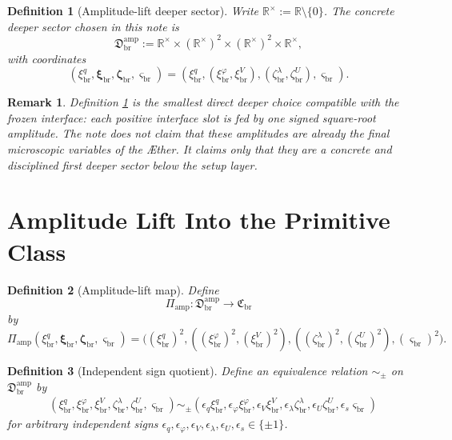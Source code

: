 \documentclass[11pt]{article}
\newcommand{\Aether}{\AE{}ther}
\newcommand{\PrimClass}{\mathfrak C_{\mathrm{br}}}
\newcommand{\DeepSector}{\mathfrak D_{\mathrm{br}}^{\mathrm{amp}}}
\newcommand{\DeepReadAmp}{\xi_{\mathrm{br}}^{q}}
\newcommand{\DeepCovAmp}{\xi_{\mathrm{br}}^{\varphi}}
\newcommand{\DeepRelaxAmp}{\xi_{\mathrm{br}}^{V}}
\newcommand{\DeepKinAmp}{\bm\xi_{\mathrm{br}}}
\newcommand{\DeepWellAmp}{\zeta_{\mathrm{br}}^{\lambda}}
\newcommand{\DeepEqAmp}{\zeta_{\mathrm{br}}^{U}}
\newcommand{\DeepAnchorAmp}{\bm\zeta_{\mathrm{br}}}
\newcommand{\DeepScaleAmp}{\varsigma_{\mathrm{br}}}
\newcommand{\AmpMap}{\Pi_{\mathrm{amp}}}
\newcommand{\SignQuot}{\sim_{\pm}}
\newcommand{\Rstar}{\mathbb R^{\times}}
\newtheorem{definition}{Definition}
\newtheorem{remark}{Remark}
\begin{document}
\begin{definition}[Amplitude-lift deeper sector]
\label{def:deep}
Write \(\Rstar:=\mathbb R\setminus\{0\}\). The concrete deeper sector chosen in this note is
\begin{equation}
\DeepSector
:=
\Rstar\times(\Rstar)^{2}\times(\Rstar)^{2}\times\Rstar,
\label{eq:deepsector}
\end{equation}
with coordinates
\begin{equation}
(\DeepReadAmp,\DeepKinAmp,\DeepAnchorAmp,\DeepScaleAmp)
=
(\DeepReadAmp,(\DeepCovAmp,\DeepRelaxAmp),(\DeepWellAmp,\DeepEqAmp),\DeepScaleAmp).
\label{eq:deepcoords}
\end{equation}
\end{definition}

\begin{remark}
Definition \ref{def:deep} is the smallest direct deeper choice compatible with the frozen interface: each positive interface slot is fed by one signed square-root amplitude. The note does not claim that these amplitudes are already the final microscopic variables of the \Aether{}. It claims only that they are a concrete and disciplined first deeper sector below the setup layer.
\end{remark}

\section{Amplitude Lift Into the Primitive Class}

\begin{definition}[Amplitude-lift map]
\label{def:ampmap}
Define
\begin{equation}
\AmpMap:\DeepSector\longrightarrow\PrimClass
\label{eq:ampmap}
\end{equation}
by
\begin{equation}
\AmpMap(\DeepReadAmp,\DeepKinAmp,\DeepAnchorAmp,\DeepScaleAmp)
=
\bigl(
(\DeepReadAmp)^{2},
((\DeepCovAmp)^{2},(\DeepRelaxAmp)^{2}),
((\DeepWellAmp)^{2},(\DeepEqAmp)^{2}),
(\DeepScaleAmp)^{2}
\bigr).
\label{eq:ampmapexplicit}
\end{equation}
\end{definition}

\begin{definition}[Independent sign quotient]
\label{def:signquot}
Define an equivalence relation \(\SignQuot\) on \(\DeepSector\) by
\begin{align}
&(\DeepReadAmp,\DeepCovAmp,\DeepRelaxAmp,\DeepWellAmp,\DeepEqAmp,\DeepScaleAmp)
\SignQuot
(\epsilon_q\DeepReadAmp,\epsilon_\varphi\DeepCovAmp,\epsilon_V\DeepRelaxAmp,
\epsilon_\lambda\DeepWellAmp,\epsilon_U\DeepEqAmp,\epsilon_s\DeepScaleAmp)
\label{eq:signquot}
\end{align}
for arbitrary independent signs
\(\epsilon_q,\epsilon_\varphi,\epsilon_V,\epsilon_\lambda,\epsilon_U,\epsilon_s\in\{\pm1\}\).
\end{definition}
\end{document}
